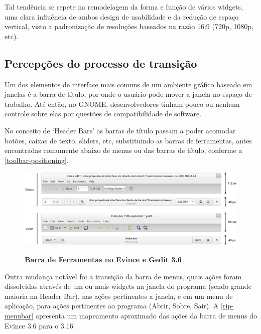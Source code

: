 Tal tendência se repete na remodelagem da forma e função de vários widgets, uma
clara influência de ambos design de usabilidade e da redução de espaço vertical,
visto a padronização de resoluções baseados na razão 16:9 (720p, 1080p, etc).

\subsection{Percepções do processo de transição}

Um dos elementos de interface mais comuns de um ambiente gráfico baseado em
janelas é a barra de título, por onde o usuário pode mover a janela no espaço de
trabalho. Até então, no GNOME, desenvolvedores tinham pouco ou nenhum controle
sobre elas por questões de compatibilidade de software.

No conceito de `Header Bars' as barras de título passam a poder acomodar botões,
caixas de texto, sliders, etc, substituindo as barras de ferramentas, antes
encontradas comumente abaixo de menus ou das barras de título, conforme a
\autoref{toolbar-positioning}.

\begin{figure}[!h]
  \begin{center}
    \caption{\textbf{Barra de Ferramentas no Evince e Gedit 3.6}}
    \includegraphics [width=\textwidth]{image/toolbar-headerbar-comparison.eps}
    \label{toolbar-positioning}
  \end{center}
\end{figure}

Outra mudança notável foi a transição da barra de menus, quais ações foram
dissolvidas através de um ou mais widgets na janela do programa (sendo grande
maioria na Header Bar), nas ações pertinentes a janela, e em um menu de
aplicação, para ações pertinentes ao programa (Abrir, Sobre, Sair). A 
\autoref {rip-menubar} apresenta um mapeamento aproximado das ações da barra de
menus do Evince 3.6 para o 3.16.

